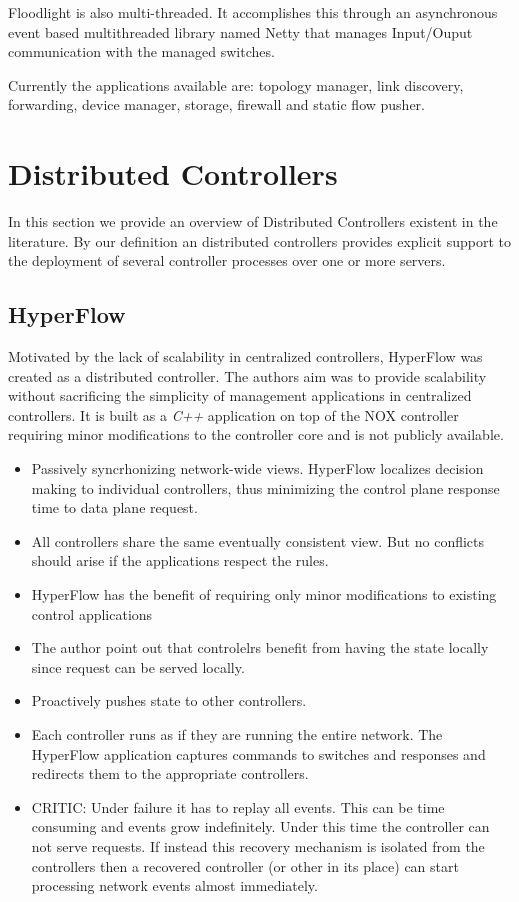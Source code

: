 \begin{itemize}
Floodlight is also multi-threaded. It accomplishes this through an
asynchronous event based multithreaded library named Netty \cite{netty} that manages Input/Ouput communication with the managed
switches. 

Currently the applications available are: topology manager,  link
discovery, forwarding, device manager, storage, firewall and
static flow pusher.  


\section{Distributed Controllers}
\glsresetall
\label{sec:relatedWork:distributed}

In this section we provide an overview of Distributed Controllers
existent in the literature. By our definition an distributed
controllers provides explicit support to the deployment of several
controller processes over one or more servers. 

\subsection{HyperFlow}
Motivated by the lack of scalability in centralized controllers, HyperFlow \cite{Tootoonchian:2010vy} 
was created as a distributed controller. The 
authors aim was to provide scalability without sacrificing
the simplicity of management applications  in  centralized controllers. It
is built as a \emph{C++} application on top of the NOX 
controller \cite{Gude:2008jd} requiring minor modifications to the
controller core and is not publicly available. 
\begin{itemize}
\item Passively syncrhonizing network-wide views. HyperFlow localizes decision making to individual controllers, thus minimizing the control plane response time to data plane request. 
\item All controllers share the same eventually consistent view. But no conflicts should arise if the applications respect the rules. 
\item HyperFlow has the benefit of requiring only minor modifications to existing control applications 
\item The author point out that controlelrs benefit from having the state locally since request can be served locally. 
\item Proactively pushes state to other controllers. 
\item Each controller runs as if they are running the entire network. The HyperFlow application captures commands to switches and responses  and redirects them to the appropriate controllers. 
\item CRITIC: Under failure it has to replay all events. This can be time consuming and events grow indefinitely. Under this time the controller can not serve requests. If instead this recovery mechanism is isolated from the controllers then a recovered controller (or other in its place) can start processing network events almost immediately. 
\end{itemize}



\end{itemize}
